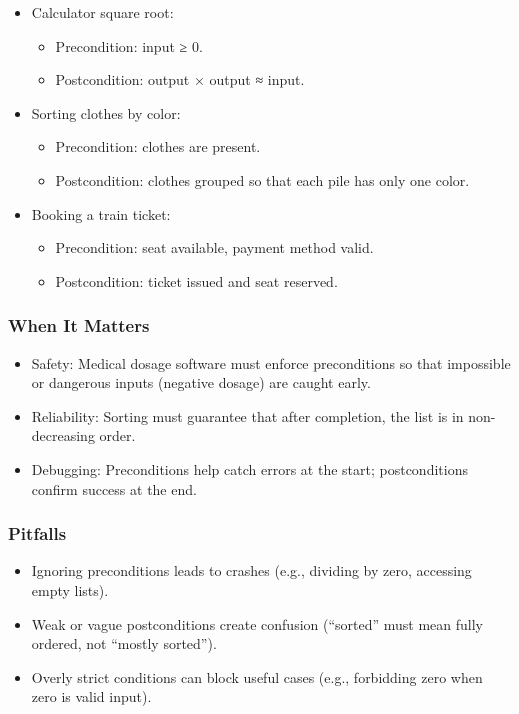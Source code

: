 \documentclass[
  letterpaper,
  DIV=11,
  numbers=noendperiod]{scrreprt}
\providecommand{\tightlist}{%
  \setlength{\itemsep}{0pt}\setlength{\parskip}{0pt}}
\begin{document}
\begin{itemize}
\item
  Calculator square root:

  \begin{itemize}
  \tightlist
  \item
    Precondition: input ≥ 0.
  \item
    Postcondition: output × output ≈ input.
  \end{itemize}
\item
  Sorting clothes by color:

  \begin{itemize}
  \tightlist
  \item
    Precondition: clothes are present.
  \item
    Postcondition: clothes grouped so that each pile has only one color.
  \end{itemize}
\item
  Booking a train ticket:

  \begin{itemize}
  \tightlist
  \item
    Precondition: seat available, payment method valid.
  \item
    Postcondition: ticket issued and seat reserved.
  \end{itemize}
\end{itemize}

\subsubsection{When It Matters}\label{when-it-matters-4}

\begin{itemize}
\tightlist
\item
  Safety: Medical dosage software must enforce preconditions so that
  impossible or dangerous inputs (negative dosage) are caught early.
\item
  Reliability: Sorting must guarantee that after completion, the list is
  in non-decreasing order.
\item
  Debugging: Preconditions help catch errors at the start;
  postconditions confirm success at the end.
\end{itemize}

\subsubsection{Pitfalls}\label{pitfalls-3}

\begin{itemize}
\tightlist
\item
  Ignoring preconditions leads to crashes (e.g., dividing by zero,
  accessing empty lists).
\item
  Weak or vague postconditions create confusion (``sorted'' must mean
  fully ordered, not ``mostly sorted'').
\item
  Overly strict conditions can block useful cases (e.g., forbidding zero
  when zero is valid input).
\end{itemize}
\end{document}
